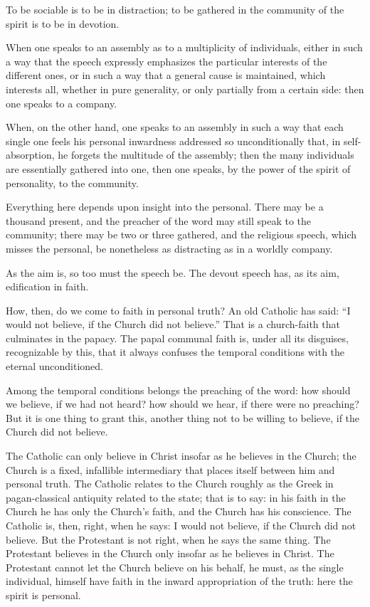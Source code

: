 \documentclass[12pt,a4paper]{book}
\begin{document}
To be sociable is to be in distraction; to be gathered in the community of the spirit is to be in devotion.

When one speaks to an assembly as to a multiplicity of individuals, either in such a way that the speech expressly emphasizes the particular interests of the different ones, or
in such a way that a general cause is maintained, which interests all, whether in pure generality, or only partially from a certain side: then one speaks to a company.

When, on the other hand, one speaks to an assembly in such a way that each single one feels his personal inwardness addressed so unconditionally that, in self-absorption, he forgets the multitude of the assembly; then the many individuals are essentially gathered into one, then one speaks, by the power of the spirit of personality, to the community.

Everything here depends upon insight into the personal. There may be a thousand present, and the preacher of the word may still speak to the community; there may be two or three gathered, and the religious speech, which misses the personal, be nonetheless as distracting as in a worldly company.

As the aim is, so too must the speech be. The devout speech has, as its aim, edification in faith.

How, then, do we come to faith in personal truth? An old Catholic has said: ``I would not believe, if the Church did not believe.'' That is a church-faith that culminates in the papacy. The papal communal faith is, under all its disguises, recognizable by this, that it always confuses the temporal conditions with the eternal unconditioned.

Among the temporal conditions belongs the preaching of the word: how should we believe, if we had not heard? how should we hear, if there were no preaching? But it is one thing to grant this, another thing not to be willing to believe, if the Church did not believe.

The Catholic can only believe in Christ insofar as he believes in the Church; the Church is a fixed, infallible intermediary that places itself between him and personal truth. The Catholic relates to the Church roughly as the Greek in pagan-classical antiquity related to the state; that is to say: in his faith in the Church he has only the Church's faith, and the Church has his conscience. The Catholic is, then, right, when he says: I would not believe, if the Church did not believe.
But the Protestant is not right, when he says the same thing. The Protestant believes in the Church only insofar as he believes in Christ. The Protestant cannot let the Church believe on his behalf, he must, as the single individual, himself have faith in the inward appropriation of the truth: here the spirit is personal.
\end{document}
